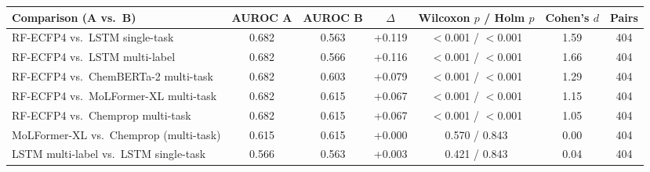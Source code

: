 \begin{tabular}{lcccccc}
\toprule
Comparison (A vs.\ B) & AUROC A & AUROC B & $\Delta$ & Wilcoxon $p$ / Holm $p$ & Cohen's $d$ & Pairs \\
\midrule
RF-ECFP4 vs.\ LSTM single-task & 0.682 & 0.563 & +0.119 & $<$0.001 / $<$0.001 & 1.59 & 404 \\
RF-ECFP4 vs.\ LSTM multi-label & 0.682 & 0.566 & +0.116 & $<$0.001 / $<$0.001 & 1.66 & 404 \\
RF-ECFP4 vs.\ ChemBERTa-2 multi-task & 0.682 & 0.603 & +0.079 & $<$0.001 / $<$0.001 & 1.29 & 404 \\
RF-ECFP4 vs.\ MoLFormer-XL multi-task & 0.682 & 0.615 & +0.067 & $<$0.001 / $<$0.001 & 1.15 & 404 \\
RF-ECFP4 vs.\ Chemprop multi-task & 0.682 & 0.615 & +0.067 & $<$0.001 / $<$0.001 & 1.05 & 404 \\
MoLFormer-XL vs.\ Chemprop (multi-task) & 0.615 & 0.615 & +0.000 & 0.570 / 0.843 & 0.00 & 404 \\
LSTM multi-label vs.\ LSTM single-task & 0.566 & 0.563 & +0.003 & 0.421 / 0.843 & 0.04 & 404 \\
\bottomrule
\end{tabular}